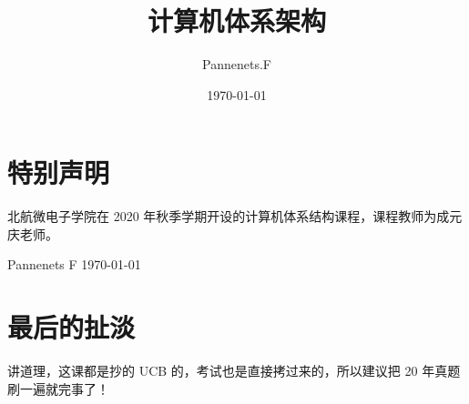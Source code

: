 \documentclass[cn,11pt,chinese,black,simple]{elegantbook}
\title{计算机体系架构}
\author{Pannenets.F}
\date{\today}
\begin{document}
\maketitle
\frontmatter

\chapter*{特别声明}

北航微电子学院在 2020 年秋季学期开设的计算机体系结构课程，课程教师为成元庆老师。

% 

\begin{flushright}
Pannenets F
\today
\end{flushright}

\tableofcontents

\mainmatter















\chapter*{最后的扯淡}

讲道理，这课都是抄的 UCB 的，考试也是直接拷过来的，所以建议把 20 年真题刷一遍就完事了！
\end{document}
